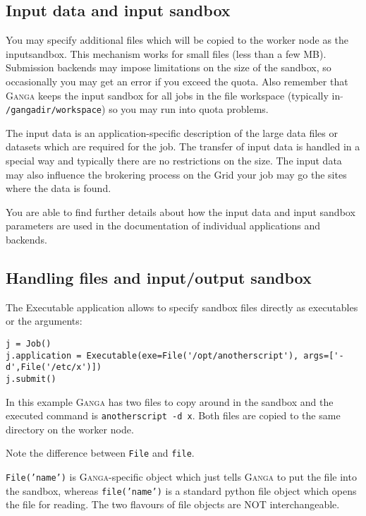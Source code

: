\documentclass{howto}
\def\ganga {\textsc{Ganga}\xspace}
\begin{document}
\subsection{Input data and input sandbox}
You may specify additional files which will be copied to the worker node as
the inputsandbox. This mechanism works for small files (less than a few MB).
Submission backends may impose limitations on the size of the sandbox, so
occasionally you may get an error if you exceed the quota. Also remember that
\ganga keeps the input sandbox for all jobs in the file workspace (typically in
\texttt{$\tilde{}$/gangadir/workspace}) so you may run into quota problems.

The input data is an application-specific description of the large data files or
datasets which are required for the job. The transfer of input data is handled
in a special way and typically there are no restrictions on the size. The
input data may also influence the brokering process on the Grid your job may go
the sites where the data is found.

You are able to find further details about how the input data and input
sandbox parameters are used in the documentation of individual applications
and backends.

\subsection{Handling files and input/output sandbox}
\label{sec:files}

The Executable application allows to specify sandbox files directly as executables or the arguments:

\begin{verbatim}
j = Job()
j.application = Executable(exe=File('/opt/anotherscript'), args=['-d',File('/etc/x')])
j.submit()
\end{verbatim}

In this example \ganga has two files to copy around in the sandbox and
the  executed command  is {\tt  anotherscript  -d x}.  Both files  are
copied to the same directory on the worker node.

\begin{notice}
Note the difference between \texttt{File} and \texttt{file}.


\texttt{File('name')} is \ganga-specific object which just tells
\ganga to put the file into the sandbox, whereas  \texttt{file('name')} is a
standard python file object which opens the file for reading.  The two
flavours of file objects are NOT interchangeable.
\end{notice}
\end{document}
